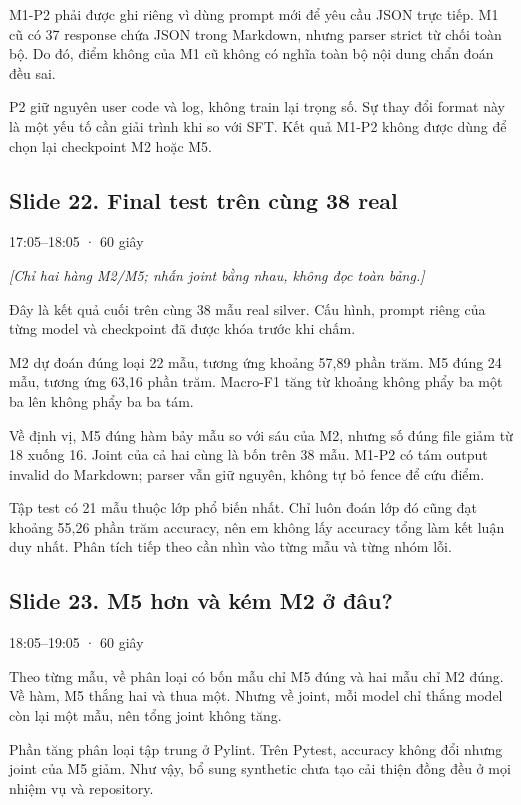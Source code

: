 \documentclass[12pt,a4paper]{article}
\begin{document}
M1-P2 phải được ghi riêng vì dùng prompt mới để yêu cầu JSON trực tiếp. M1 cũ có 37 response chứa JSON trong Markdown, nhưng parser strict từ chối toàn bộ. Do đó, điểm không của M1 cũ không có nghĩa toàn bộ nội dung chẩn đoán đều sai.

P2 giữ nguyên user code và log, không train lại trọng số. Sự thay đổi format này là một yếu tố cần giải trình khi so với SFT. Kết quả M1-P2 không được dùng để chọn lại checkpoint M2 hoặc M5.

\subsection*{Slide 22. Final test trên cùng 38 real}
{\small\color{gray}17:05–18:05 · 60 giây}\par
{\itshape\color{gray}[Chỉ hai hàng M2/M5; nhấn joint bằng nhau, không đọc toàn bảng.]}\par
Đây là kết quả cuối trên cùng 38 mẫu real silver. Cấu hình, prompt riêng của từng model và checkpoint đã được khóa trước khi chấm.

M2 dự đoán đúng loại 22 mẫu, tương ứng khoảng 57,89 phần trăm. M5 đúng 24 mẫu, tương ứng 63,16 phần trăm. Macro-F1 tăng từ khoảng không phẩy ba một ba lên không phẩy ba ba tám.

Về định vị, M5 đúng hàm bảy mẫu so với sáu của M2, nhưng số đúng file giảm từ 18 xuống 16. Joint của cả hai cùng là bốn trên 38 mẫu. M1-P2 có tám output invalid do Markdown; parser vẫn giữ nguyên, không tự bỏ fence để cứu điểm.

Tập test có 21 mẫu thuộc lớp phổ biến nhất. Chỉ luôn đoán lớp đó cũng đạt khoảng 55,26 phần trăm accuracy, nên em không lấy accuracy tổng làm kết luận duy nhất. Phân tích tiếp theo cần nhìn vào từng mẫu và từng nhóm lỗi.

\clearpage
\subsection*{Slide 23. M5 hơn và kém M2 ở đâu?}
{\small\color{gray}18:05–19:05 · 60 giây}\par
Theo từng mẫu, về phân loại có bốn mẫu chỉ M5 đúng và hai mẫu chỉ M2 đúng. Về hàm, M5 thắng hai và thua một. Nhưng về joint, mỗi model chỉ thắng model còn lại một mẫu, nên tổng joint không tăng.

Phần tăng phân loại tập trung ở Pylint. Trên Pytest, accuracy không đổi nhưng joint của M5 giảm. Như vậy, bổ sung synthetic chưa tạo cải thiện đồng đều ở mọi nhiệm vụ và repository.
\end{document}
